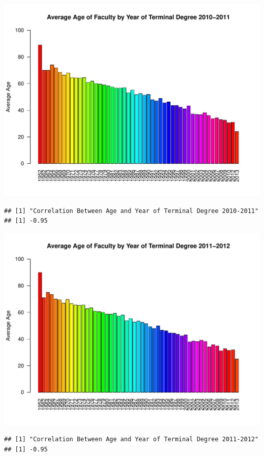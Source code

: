 \documentclass[12pt,a4paper]{article}\usepackage[]{graphicx}\usepackage[]{color}
\makeatletter
\def\maxwidth{ %
  \ifdim\Gin@nat@width>\linewidth
    \linewidth
  \else
    \Gin@nat@width
  \fi
}
\newenvironment{kframe}{%
 \def\at@end@of@kframe{}%
 \ifinner\ifhmode%
  \def\at@end@of@kframe{\end{minipage}}%
  \begin{minipage}{\columnwidth}%
 \fi\fi%
 \def\FrameCommand##1{\hskip\@totalleftmargin \hskip-\fboxsep
 \colorbox{shadecolor}{##1}\hskip-\fboxsep
     \hskip-\linewidth \hskip-\@totalleftmargin \hskip\columnwidth}%
 \MakeFramed {\advance\hsize-\width
   \@totalleftmargin\z@ \linewidth\hsize
   \@setminipage}}%
 {\par\unskip\endMakeFramed%
 \at@end@of@kframe}
\newenvironment{knitrout}{}{} %
\theoremstyle{definition}
\makeatother
\begin{document}
\begin{knitrout}
\begin{kframe}
\begin{verbatim}
\end{verbatim}
\end{kframe}
\includegraphics[width=\maxwidth]{figure/unnamed-chunk-12-7} 
\begin{kframe}\begin{verbatim}
## [1] "Correlation Between Age and Year of Terminal Degree 2010-2011"
## [1] -0.95
\end{verbatim}
\end{kframe}
\includegraphics[width=\maxwidth]{figure/unnamed-chunk-12-8} 
\begin{kframe}\begin{verbatim}
## [1] "Correlation Between Age and Year of Terminal Degree 2011-2012"
## [1] -0.95
\end{verbatim}

\end{kframe}
\end{knitrout}
\end{document}
